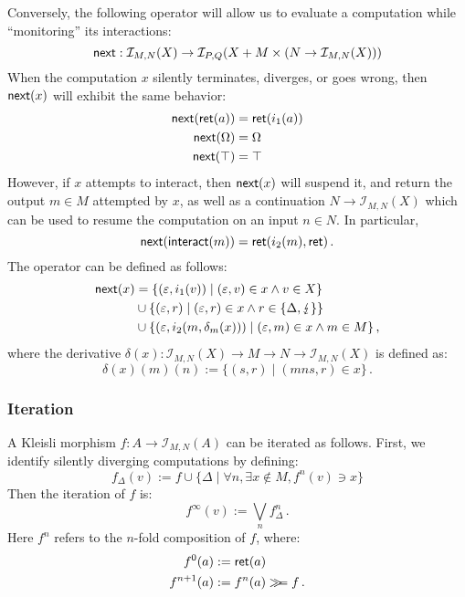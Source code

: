 Conversely,
the following operator
will allow us to evaluate a computation
while ``monitoring'' its interactions:
\[
     \mathsf{next}  :
       \mathcal{I}_{M,N}(X) \rightarrow
       \mathcal{I}_{P,Q}(X + M \times (N \rightarrow \mathcal{I}_{M,N}(X)))
\]
When the computation $x$ silently terminates, diverges, or goes wrong,
then $ \mathsf{next} (x)$ will exhibit the same behavior:
\begin{align*}
     \mathsf{next} ( \mathsf{ret} (a)) &=  \mathsf{ret} (i_1(a)) \\
     \mathsf{next} (\Omega) &= \Omega \\
     \mathsf{next} (\top) &= \top
\end{align*}
However,
if $x$ attempts to interact,
then $ \mathsf{next} (x)$ will suspend it,
and return the output $m \in M$ attempted by $x$,
as well as a continuation $N \rightarrow \mathcal{I}_{M,N}(X)$
which can be used to resume the computation
on an input $n \in N$.
In particular,
\[
     \mathsf{next} ( \mathsf{interact} (m)) =  \mathsf{ret} (i_2(m),  \mathsf{ret} ) \,.
\]
The operator can be defined as follows:
\begin{align*}
     \mathsf{next} (x) &= \{ (\varepsilon, i_1(v)) \mid
                       (\varepsilon, v) \in x \wedge
                       v \in X \} \\
              &\cup \{ (\varepsilon, r) \mid
                       (\varepsilon, r) \in x \wedge
                       r \in \{\Delta,\lightning\} \} \\
              &\cup \{ (\varepsilon, i_2(m, \delta_m(x))) \mid
                       (\varepsilon, m) \in x \wedge
                       m \in M \} \,,
\end{align*}
where the derivative
$\delta(x) :
   \mathcal{I}_{M,N}(X) \rightarrow M \rightarrow N \rightarrow
   \mathcal{I}_{M,N}(X)$
is defined as:
\[
    \delta(x)(m)(n) := \{ (s, r) \mid (mns, r) \in x \} \,.
\]


\subsubsection{Iteration} %

A Kleisli morphism $f : A \rightarrow \mathcal{I}_{M,N}(A)$
can be iterated as follows.
First,
we identify silently diverging computations by defining:
\[
    f_\Delta(v) :=
      f \cup \{ \Delta \mid \forall n, \exists x \notin M, f^n(v) \ni x \}
\]
Then the iteration of $f$ is:
\[
    f^\infty(v) :=
      \bigvee_{n} f_\Delta^n \,.
\]
Here $f^n$ refers to the $n$-fold composition of $f$,
where:
\begin{align*}
    f^0(a) &:=  \mathsf{ret} (a) \\
    f^{n+1}(a) &:= f^n(a) \gg\!\!= f \,.
\end{align*}

